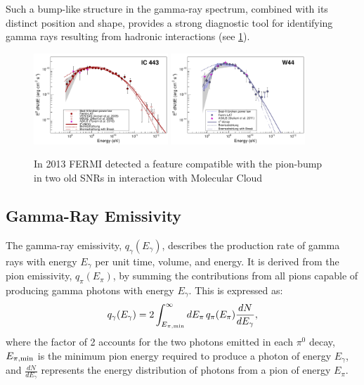 Such a bump-like structure in the gamma-ray spectrum, combined with its distinct position and shape, provides a strong diagnostic tool for identifying gamma rays resulting from hadronic interactions (see \ref{fig:pionbumpfermi}).  

\begin{figure}[!t]
\centering
\includegraphics[width=0.45\textwidth]{figures/1231160fig2a.pdf}
\includegraphics[width=0.45\textwidth]{figures/1231160fig2b.pdf}
\caption{In 2013 FERMI detected a feature compatible with the pion-bump in two old SNRs in interaction with Molecular Cloud~\cite{Ackermann2013sci}}
\label{fig:pionbumpfermi}
\end{figure}

\subsection{Gamma-Ray Emissivity}

The gamma-ray emissivity, \(q_\gamma(E_\gamma)\), describes the production rate of gamma rays with energy \(E_\gamma\) per unit time, volume, and energy. It is derived from the pion emissivity, \(q_\pi(E_\pi)\), by summing the contributions from all pions capable of producing gamma photons with energy \(E_\gamma\). This is expressed as:
\begin{equation}
q_\gamma(E_\gamma) = 2 \int_{E_{\pi, \rm min}}^\infty dE_\pi \, q_\pi(E_\pi) \frac{dN}{dE_\gamma},
\end{equation}
where the factor of 2 accounts for the two photons emitted in each \(\pi^0\) decay,  \(E_{\pi, \rm min}\) is the minimum pion energy required to produce a photon of energy \(E_\gamma\), and \(\frac{dN}{dE_\gamma}\) represents the energy distribution of photons from a pion of energy \(E_\pi\).  

